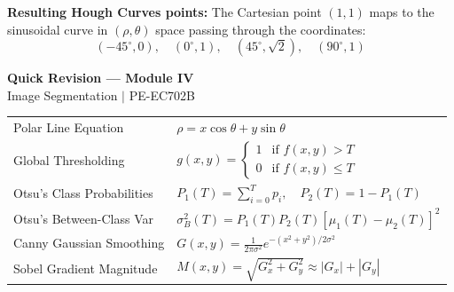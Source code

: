 \documentclass[12pt,a4paper]{article}
\renewcommand{\arraystretch}{1.45}
\begin{document}
\begin{tcolorbox}[examplebox, title={Hough Transform Line Mapping}]
\par\noindent\textbf{Resulting Hough Curves points:}
The Cartesian point $(1,1)$ maps to the sinusoidal curve in $(\rho, \theta)$ space passing through the coordinates:
\begin{equation*}
  (-45^\circ, 0), \quad (0^\circ, 1), \quad (45^\circ, \sqrt{2}), \quad (90^\circ, 1)
\end{equation*}
\end{tcolorbox}

\newpage

\begin{center}
  {\large\bfseries\color{myred} Quick Revision --- Module IV}\\[3pt]
  {\small\color{mydark} Image Segmentation $|$ PE-EC702B}
\end{center}
\noindent{\color{myred}\rule{\linewidth}{1.2pt}}
\vspace{4pt}

\begin{tcolorbox}[formulabox, title={\textbf{Key Formulas at a Glance}}]
\renewcommand{\arraystretch}{1.3}
\begin{tabularx}{\linewidth}{B{5.0cm} X}Polar Line Equation & $\rho = x \cos\theta + y \sin\theta$ \\
Global Thresholding & $g(x,y) = \begin{cases} 1 & \text{if } f(x,y) > T \\ 0 & \text{if } f(x,y) \le T \end{cases}$ \\
Otsu's Class Probabilities & $P_1(T) = \sum_{i=0}^T p_i, \quad P_2(T) = 1 - P_1(T)$ \\
Otsu's Between-Class Var & $\sigma_B^2(T) = P_1(T) P_2(T) [\mu_1(T) - \mu_2(T)]^2$ \\
Canny Gaussian Smoothing & $G(x,y) = \frac{1}{2\pi \sigma^2} e^{-(x^2+y^2)/2\sigma^2}$ \\
Sobel Gradient Magnitude & $M(x,y) = \sqrt{G_x^2 + G_y^2} \approx |G_x| + |G_y|$
\end{tabularx}
\end{tcolorbox}
\end{document}
